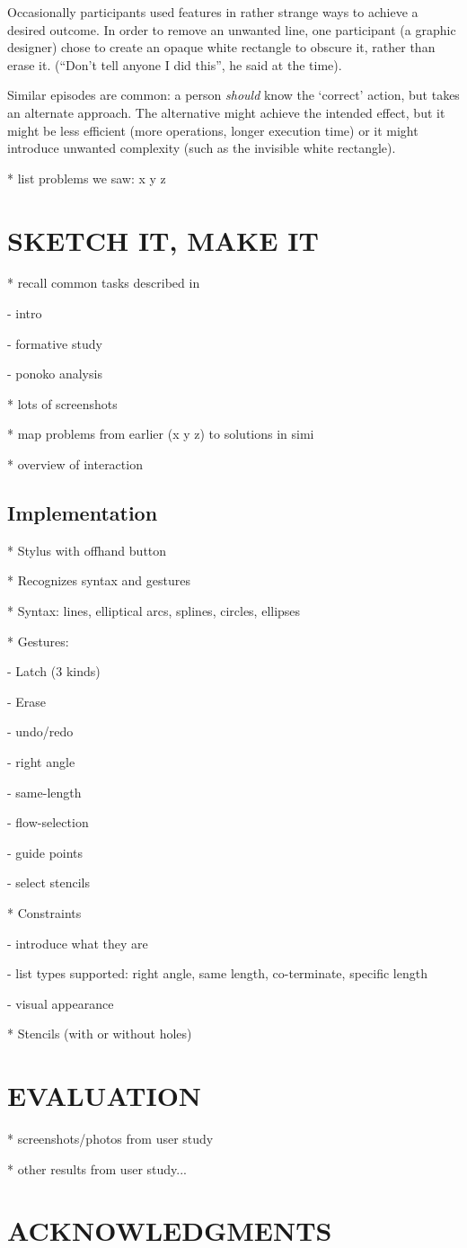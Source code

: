 \documentclass{article}
\begin{document}
Occasionally participants used features in rather strange ways to
achieve a desired outcome. In order to remove an unwanted line, one
participant (a graphic designer) chose to create an opaque white
rectangle to obscure it, rather than erase it. (``Don't tell anyone I
did this'', he said at the time).

Similar episodes are common: a person \textit{should} know the
`correct' action, but takes an alternate approach. The alternative
might achieve the intended effect, but it might be less efficient
(more operations, longer execution time) or it might introduce
unwanted complexity (such as the invisible white rectangle).

* list problems we saw: x y z


\section{SKETCH IT, MAKE IT}

* recall common tasks described in

  - intro

  - formative study

  - ponoko analysis

* lots of screenshots

* map problems from earlier (x y z) to solutions in simi

* overview of interaction

\subsection{Implementation}

* Stylus with offhand button

* Recognizes syntax and gestures

* Syntax: lines, elliptical arcs, splines, circles, ellipses

* Gestures:

  - Latch (3 kinds) 

  - Erase 

  - undo/redo

  - right angle

  - same-length 

  - flow-selection

  - guide points

  - select stencils

* Constraints

  - introduce what they are

  - list types supported: right angle, same length, co-terminate, specific length

  - visual appearance

* Stencils (with or without holes)

\section{EVALUATION}

* screenshots/photos from user study

* other results from user study...

\section{ACKNOWLEDGMENTS}



\end{document}
